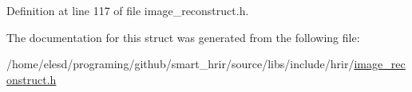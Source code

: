 Definition at line 117 of file image\-\_\-reconstruct.\-h.



The documentation for this struct was generated from the following file\-:\begin{DoxyCompactItemize}
\item 
/home/elesd/programing/github/smart\-\_\-hrir/source/libs/include/hrir/\hyperlink{a00013}{image\-\_\-reconstruct.\-h}\end{DoxyCompactItemize}
